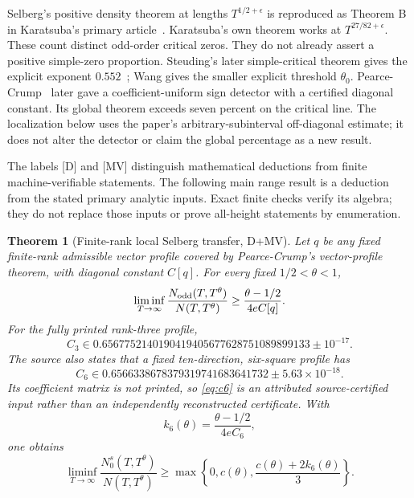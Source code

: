 ﻿\documentclass[11pt]{article}
\newtheorem{theorem}{Theorem}[section]
\theoremstyle{remark}
\begin{document}
Selberg's positive density theorem at lengths $T^{1/2+\epsilon}$ is
reproduced as Theorem B in Karatsuba's primary article~\cite{Karatsuba}.
Karatsuba's own theorem works at $T^{27/82+\epsilon}$. These count distinct
odd-order critical zeros. They do not already assert a positive simple-zero
proportion. Steuding's later simple-critical theorem gives the explicit
exponent $0.552$~\cite{Steuding,SteudingThesis}; Wang gives the smaller
explicit threshold $\theta_0$. Pearce-Crump~\cite{PearceCrump} later gave a
coefficient-uniform sign detector with a certified diagonal constant. Its
global theorem exceeds seven percent on the critical line. The localization
below uses the paper's arbitrary-subinterval off-diagonal estimate; it does
not alter the detector or claim the global percentage as a new result.

The labels [D] and [MV] distinguish mathematical deductions from finite
machine-verifiable statements. The following main range result is a
deduction from the stated primary analytic inputs. Exact finite checks
verify its algebra; they do not replace those inputs or prove all-height
statements by enumeration.

\begin{theorem}[Finite-rank local Selberg transfer, D+MV]
\label{thm:localselberg}
Let $q$ be any fixed finite-rank admissible vector profile covered by
Pearce-Crump's vector-profile theorem, with diagonal constant $C[q]$. For every
fixed $1/2<\theta<1$,
\begin{equation}\label{eq:localodd}
 \liminf_{T\to\infty}
 \frac{N_{\rm odd}(T,T^\theta)}{N(T,T^\theta)}
 \ge\frac{\theta-1/2}{4eC[q]}.
\end{equation}
For the fully printed rank-three profile,
\[
 C_3\in0.6567752140190419405677628751089899133\pm10^{-17}.
\]
The source also states that a fixed ten-direction, six-square profile has
\begin{equation}\label{eq:c6}
 C_6\in0.6566338678379319741683641732\pm5.63\times10^{-18}.
\end{equation}
Its coefficient matrix is not printed, so \eqref{eq:c6} is an attributed
source-certified input rather than an independently reconstructed certificate.
With
\[
 k_6(\theta)=\frac{\theta-1/2}{4eC_6},
\]
one obtains
\begin{equation}\label{eq:localsimple}
 \liminf_{T\to\infty}
 \frac{N_0^s(T,T^\theta)}{N(T,T^\theta)}
 \ge\max\left\{0,c(\theta),\frac{c(\theta)+2k_6(\theta)}3\right\}.
\end{equation}
\end{theorem}
\end{document}
